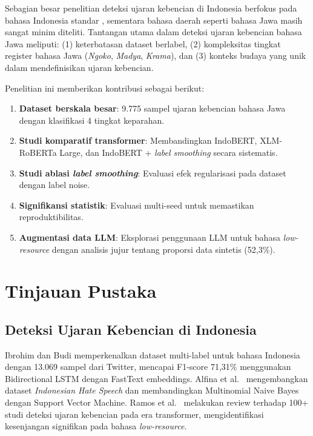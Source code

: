 \documentclass[10pt,twocolumn]{article}
\begin{document}
Sebagian besar penelitian deteksi ujaran kebencian di Indonesia berfokus pada bahasa Indonesia standar \cite{ibrohim2019,alfina2017}, sementara bahasa daerah seperti bahasa Jawa masih sangat minim diteliti. Tantangan utama dalam deteksi ujaran kebencian bahasa Jawa meliputi: (1) keterbatasan dataset berlabel, (2) kompleksitas tingkat register bahasa Jawa (\textit{Ngoko}, \textit{Madya}, \textit{Krama}), dan (3) konteks budaya yang unik dalam mendefinisikan ujaran kebencian.

Penelitian ini memberikan kontribusi sebagai berikut:
\begin{enumerate}[leftmargin=*,nosep]
    \item \textbf{Dataset berskala besar}: 9.775 sampel ujaran kebencian bahasa Jawa dengan klasifikasi 4 tingkat keparahan.
    \item \textbf{Studi komparatif transformer}: Membandingkan IndoBERT, XLM-RoBERTa Large, dan IndoBERT + \textit{label smoothing} secara sistematis.
    \item \textbf{Studi ablasi \textit{label smoothing}}: Evaluasi efek regularisasi pada dataset dengan label noise.
    \item \textbf{Signifikansi statistik}: Evaluasi multi-seed untuk memastikan reproduktibilitas.
    \item \textbf{Augmentasi data LLM}: Eksplorasi penggunaan LLM untuk bahasa \textit{low-resource} dengan analisis jujur tentang proporsi data sintetis (52,3\%).
\end{enumerate}

\section{Tinjauan Pustaka}

\subsection{Deteksi Ujaran Kebencian di Indonesia}

Ibrohim dan Budi \cite{ibrohim2019} memperkenalkan dataset multi-label untuk bahasa Indonesia dengan 13.069 sampel dari Twitter, mencapai F1-score 71,31\% menggunakan Bidirectional LSTM dengan FastText embeddings. Alfina et al.\ \cite{alfina2017} mengembangkan dataset \textit{Indonesian Hate Speech} dan membandingkan Multinomial Naive Bayes dengan Support Vector Machine. Ramos et al.\ \cite{ramos2024} melakukan review terhadap 100+ studi deteksi ujaran kebencian pada era transformer, mengidentifikasi kesenjangan signifikan pada bahasa \textit{low-resource}.
\end{document}
